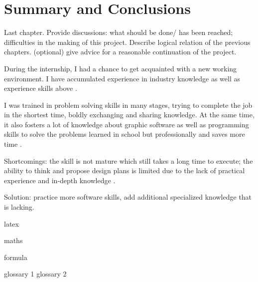 \chapter{Summary and Conclusions}

Last chapter. Provide discussions: what should be done/ has been reached; difficulties in the making of this project. Describe logical relation of the previous chapters. (optional) give advice for a reasonable continuation of the project.

During the internship, I had a chance to get acquainted with a new working environment. I have accumulated experience in industry knowledge as well as experience skills above \cite{marghitu_2009_mechanisms}.

I was trained in problem solving skills in many stages, trying to complete the job in the shortest time, boldly exchanging and sharing knowledge. At the same time, it also fosters a lot of knowledge about graphic software as well as programming skills to solve the problems learned in school but professionally and saves more time \cite{li_1984_hng}.

Shortcomings: the skill is not mature which still takes a long time to execute; the ability to think and propose design plans is limited due to the lack of practical experience and in-depth knowledge \cite{li_1984_hng}.

Solution: practice more software skills, add additional specialized knowledge that is lacking.

\gls{latex} 

\gls{maths} 

\gls{formula}

\Gls{glossary 1}
\Gls{glossary 2}


